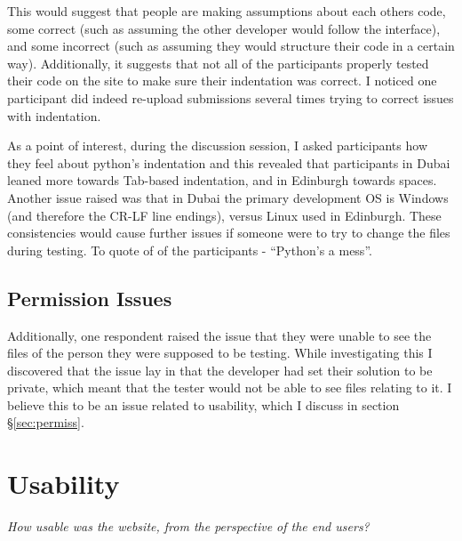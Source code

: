 \documentclass[a4paper,11pt]{report}
\begin{document}
This would suggest that people are making assumptions about each others code, some correct (such as assuming the other developer would follow the interface), and some incorrect (such as assuming they would structure their code in a certain way). Additionally, it suggests that not all of the participants properly tested their code on the site to make sure their indentation was correct. I noticed one participant did indeed re-upload submissions several times trying to correct issues with indentation.\par
As a point of interest, during the discussion session, I asked participants how they feel about python's indentation and this revealed that participants in Dubai leaned more towards Tab-based indentation, and in Edinburgh towards spaces. Another issue raised was that in Dubai the primary development OS is Windows (and therefore the CR-LF line endings), versus Linux used in Edinburgh. These consistencies would cause further issues if someone were to try to change the files during testing. To quote of of the participants - ``Python's a mess''.
\subsection{Permission Issues}
Additionally, one respondent raised the issue that they were unable to see the files of the person they were supposed to be testing. While investigating this I discovered that the issue lay in that the developer had set their solution to be private, which meant that the tester would not be able to see files relating to it. I believe this to be an issue related to usability, which I discuss in section \S\ref{sec:permiss}.

\section{Usability}
\textit{How usable was the website, from the perspective of the end users?}\par
\end{document}
